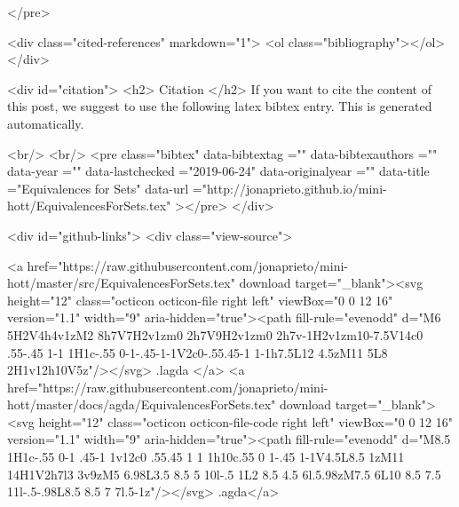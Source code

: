 </pre>


  <div class="cited-references" markdown="1">
  <ol class="bibliography"></ol>
  </div>


  
  <div id="citation">
  <h2> Citation </h2>
  If you want to cite the content of this post,
  we suggest to use the following latex bibtex entry.
  This is generated automatically.

  <br/>
  <br/>
  <pre class="bibtex"
       data-bibtextag =""
       data-bibtexauthors =""
       data-year =""
       data-lastchecked ="2019-06-24"
       data-originalyear =""
       data-title ="Equivalences for Sets"
       data-url ="http://jonaprieto.github.io/mini-hott/EquivalencesForSets.tex"
  ></pre>
  </div>
  

  <div id="github-links">
    <div class="view-source">
      
        <a href="https://raw.githubusercontent.com/jonaprieto/mini-hott/master/src/EquivalencesForSets.tex" download target="_blank"><svg height="12" class="octicon octicon-file right left" viewBox="0 0 12 16" version="1.1" width="9" aria-hidden="true"><path fill-rule="evenodd" d="M6 5H2V4h4v1zM2 8h7V7H2v1zm0 2h7V9H2v1zm0 2h7v-1H2v1zm10-7.5V14c0 .55-.45 1-1 1H1c-.55 0-1-.45-1-1V2c0-.55.45-1 1-1h7.5L12 4.5zM11 5L8 2H1v12h10V5z"/></svg> .lagda </a>
        <a href="https://raw.githubusercontent.com/jonaprieto/mini-hott/master/docs/agda/EquivalencesForSets.tex" download target="_blank"><svg height="12" class="octicon octicon-file-code right left" viewBox="0 0 12 16" version="1.1" width="9" aria-hidden="true"><path fill-rule="evenodd" d="M8.5 1H1c-.55 0-1 .45-1 1v12c0 .55.45 1 1 1h10c.55 0 1-.45 1-1V4.5L8.5 1zM11 14H1V2h7l3 3v9zM5 6.98L3.5 8.5 5 10l-.5 1L2 8.5 4.5 6l.5.98zM7.5 6L10 8.5 7.5 11l-.5-.98L8.5 8.5 7 7l.5-1z"/></svg> .agda</a>
      
